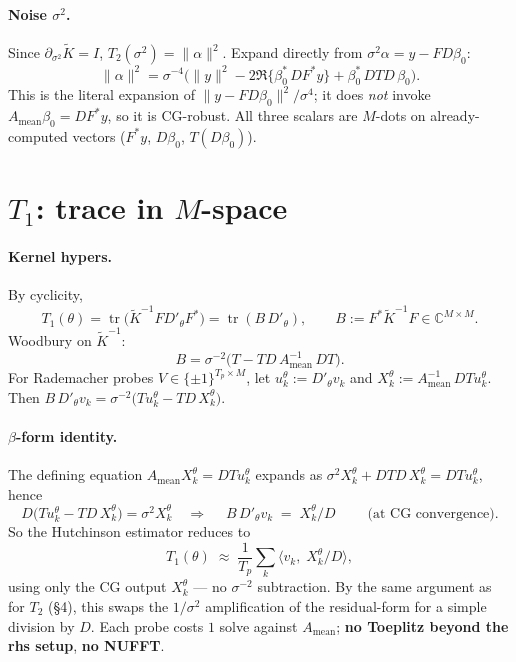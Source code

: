\documentclass[11pt]{article}
\newcommand{\tr}{\operatorname{tr}}
\newcommand{\Ktil}{\widetilde K}
\newcommand{\Amean}{A_{\text{mean}}}
\begin{document}
\paragraph{Noise $\sigma^2$.} Since $\partial_{\sigma^2}\Ktil = I$, $T_2(\sigma^2) = \|\alpha\|^2$. Expand directly from $\sigma^2\alpha = y - FD\beta_0$:
\begin{equation}
  \boxed{\;\|\alpha\|^2 = \sigma^{-4}\bigl(\|y\|^2 - 2\Re\{\beta_0^*\,DF^*y\} + \beta_0^*\,DTD\,\beta_0\bigr).\;}
\end{equation}
This is the literal expansion of $\|y - FD\beta_0\|^2/\sigma^4$; it does \emph{not} invoke $\Amean\beta_0 = DF^*y$, so it is CG-robust. All three scalars are $M$-dots on already-computed vectors ($F^*y$, $D\beta_0$, $T(D\beta_0)$).

\section{$T_1$: trace in $M$-space}

\paragraph{Kernel hypers.} By cyclicity,
\begin{equation}
  T_1(\theta) = \tr\!\bigl(\Ktil^{-1}FD'_\theta F^*\bigr) = \tr(B\,D'_\theta),\qquad
  B := F^*\Ktil^{-1}F \in\mathbb{C}^{M\times M}.
\end{equation}
Woodbury on $\Ktil^{-1}$:
\begin{equation}
  B = \sigma^{-2}\bigl(T - TD\,\Amean^{-1}\,DT\bigr).\label{eq:B}
\end{equation}
For Rademacher probes $V\in\{\pm1\}^{T_p\times M}$, let $u_k^\theta := D'_\theta v_k$ and $X_k^\theta := \Amean^{-1}\,DTu_k^\theta$. Then $B\,D'_\theta v_k = \sigma^{-2}\bigl(Tu_k^\theta - TD\,X_k^\theta\bigr)$.

\paragraph{$\beta$-form identity.} The defining equation $\Amean X_k^\theta = DTu_k^\theta$ expands as $\sigma^2 X_k^\theta + DTD\,X_k^\theta = DTu_k^\theta$, hence
\begin{equation}
  D\bigl(Tu_k^\theta - TD\,X_k^\theta\bigr) = \sigma^2 X_k^\theta\quad\Longrightarrow\quad
  \boxed{\;B\,D'_\theta v_k \;=\; X_k^\theta/D\;}\qquad\text{(at CG convergence)}.\label{eq:T1beta}
\end{equation}
So the Hutchinson estimator reduces to
\begin{equation}
  T_1(\theta) \;\approx\; \frac{1}{T_p}\sum_k \bigl\langle v_k,\; X_k^\theta/D\bigr\rangle,
\end{equation}
using only the CG output $X_k^\theta$ --- no $\sigma^{-2}$ subtraction. By the same argument as for $T_2$ (\S4), this swaps the $1/\sigma^2$ amplification of the residual-form for a simple division by $D$. Each probe costs $1$ solve against $\Amean$; \textbf{no Toeplitz beyond the rhs setup}, \textbf{no NUFFT}.
\end{document}
